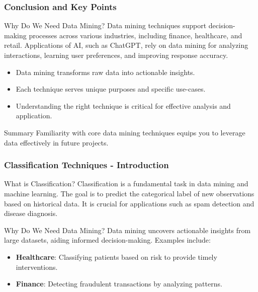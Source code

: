 \documentclass[aspectratio=169]{beamer}
\begin{document}
\begin{frame}[fragile]
    \frametitle{Conclusion and Key Points}
    \begin{block}{Why Do We Need Data Mining?}
        Data mining techniques support decision-making processes across various industries, including finance, healthcare, and retail.
        Applications of AI, such as ChatGPT, rely on data mining for analyzing interactions, learning user preferences, and improving response accuracy.
    \end{block}

    \begin{itemize}
        \item Data mining transforms raw data into actionable insights.
        \item Each technique serves unique purposes and specific use-cases.
        \item Understanding the right technique is critical for effective analysis and application.
    \end{itemize}

    \begin{block}{Summary}
        Familiarity with core data mining techniques equips you to leverage data effectively in future projects.
    \end{block}
\end{frame}

\begin{frame}[fragile]
    \frametitle{Classification Techniques - Introduction}
    \begin{block}{What is Classification?}
        Classification is a fundamental task in data mining and machine learning. 
        The goal is to predict the categorical label of new observations based on historical data.
        It is crucial for applications such as spam detection and disease diagnosis.
    \end{block}

    \begin{block}{Why Do We Need Data Mining?}
        Data mining uncovers actionable insights from large datasets, aiding informed decision-making. Examples include:
        \begin{itemize}
            \item \textbf{Healthcare}: Classifying patients based on risk to provide timely interventions.
            \item \textbf{Finance}: Detecting fraudulent transactions by analyzing patterns.
        \end{itemize}
    \end{block}
\end{frame}
\end{document}
